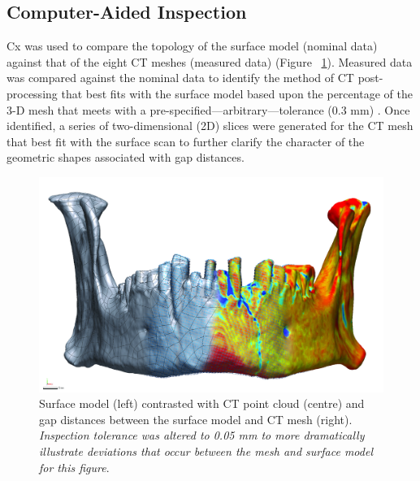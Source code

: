 \documentclass[review]{elsarticle}
\begin{document}
\subsection{Computer-Aided Inspection}

Cx was used to compare the topology of the surface model (nominal data) against that of the eight CT meshes (measured data) \citep{RN11473} (Figure ~\ref{fig:Fig1x}). Measured data was compared against the nominal data \citep{RN11463,RN5923,RN11460,RN11465} to identify the method of CT post-processing that best fits with the surface model based upon the percentage of the 3-D mesh that meets with a pre-specified---arbitrary---tolerance (0.3 mm) \citep{RN5925,RN11471,RN11455}. Once identified, a series of two-dimensional (2D) slices were generated for the CT mesh that best fit with the surface scan to further clarify the character of the geometric shapes associated with gap distances.

\begin{figure}[ht]\centering
\includegraphics[width=\linewidth]{Fig2}
\caption{Surface model (left) contrasted with CT point cloud (centre) and gap distances between the surface model and CT mesh (right). \textit{Inspection tolerance was altered to 0.05 mm to more dramatically illustrate deviations that occur between the mesh and surface model for this figure}.}
\label{fig:Fig1x}
\end{figure}
\end{document}
